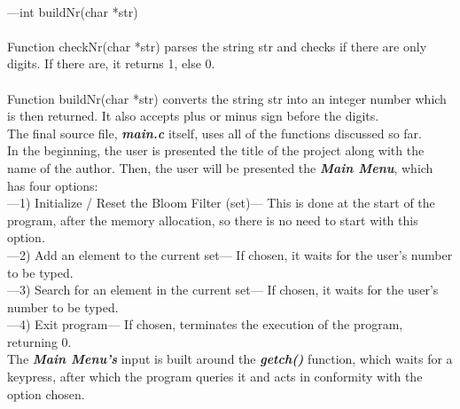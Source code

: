 \documentclass[14pt]{article}
\begin{document}
\\---int buildNr(char *str)
\\
\\Function checkNr(char *str) parses the string str and checks if there are only digits. If there are, it returns 1, else 0.
\\
\\Function buildNr(char *str) converts the string str into an integer number which is then returned. It also accepts plus or minus sign before the digits.
\vspace{3 mm}
\\The final source file, \textbf{\textit{main.c}} itself, uses all of the functions discussed so far.
\\In the beginning, the user is presented the title of the project along with the name of the author. Then, the user will be presented the \textbf{\textit{Main Menu}}, which has four options:
\\---1) Initialize / Reset the Bloom Filter (set)--- This is done at the start of the program, after the memory allocation, so there is no need to start with this option.
\\---2) Add an element to the current set--- If chosen, it waits for the user's number to be typed.
\\---3) Search for an element in the current set--- If chosen, it waits for the user's number to be typed.
\\---4) Exit program--- If chosen, terminates the execution of the program, returning 0.
\\The \textbf{\textit{Main Menu's}} input is built around the \textbf{\textit{getch()}} function, which waits for a keypress, after which the program queries it and acts in conformity with the option chosen.

\newpage
\end{document}
